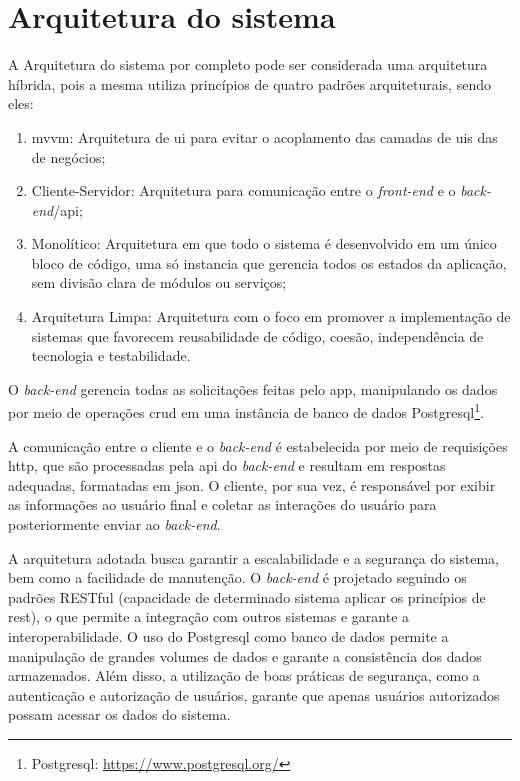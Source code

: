 \section{Arquitetura do sistema}\label{sec:arquitetura}
A Arquitetura do sistema por completo pode ser considerada uma arquitetura híbrida, pois a mesma utiliza princípios de quatro padrões arquiteturais, sendo eles:

\begin{enumerate}
   \item \ac{mvvm}: Arquitetura de \ac{ui} para evitar o acoplamento das camadas de \acp{ui} das de negócios;
   \item Cliente-Servidor: Arquitetura para comunicação entre o \textit{front-end} e o \textit{back-end}/\ac{api};
   \item Monolítico: Arquitetura em que todo o sistema é desenvolvido em um único bloco de código, uma só instancia que gerencia todos os estados da aplicação, sem divisão clara de módulos ou serviços;
   \item Arquitetura Limpa: Arquitetura com o foco em promover a implementação de sistemas que favorecem reusabilidade de código, coesão, independência de tecnologia e testabilidade.
 \end{enumerate}

O \textit{back-end} gerencia todas as solicitações feitas pelo \ac{app}, manipulando os dados por meio de operações \ac{crud} em uma instância de banco de dados Postgresql\footnote{\label{postgresql}Postgresql: \url{https://www.postgresql.org/}}.

A comunicação entre o cliente e o \textit{back-end} é estabelecida por meio de requisições \ac{http}, que são processadas pela \ac{api} do \textit{back-end} e resultam em respostas adequadas, formatadas em \ac{json}. O cliente, por sua vez, é responsável por exibir as informações ao usuário final e coletar as interações do usuário para posteriormente enviar ao \textit{back-end}.

A arquitetura adotada busca garantir a escalabilidade e a segurança do sistema, bem como a facilidade de manutenção. O \textit{back-end} é projetado seguindo os padrões RESTful (capacidade de determinado sistema aplicar os princípios de \ac{rest}), o que permite a integração com outros sistemas e garante a interoperabilidade. O uso do Postgresql como banco de dados permite a manipulação de grandes volumes de dados e garante a consistência dos dados armazenados. Além disso, a utilização de boas práticas de segurança, como a autenticação e autorização de usuários, garante que apenas usuários autorizados possam acessar os dados do sistema.


